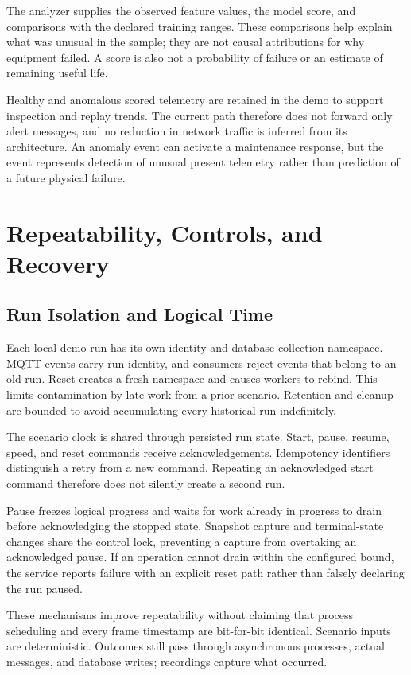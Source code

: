 \documentclass[journal]{IEEEtran}
\begin{document}
The analyzer supplies the observed feature values, the model score, and comparisons with the declared training ranges. These comparisons help explain what was unusual in the sample; they are not causal attributions for why equipment failed. A score is also not a probability of failure or an estimate of remaining useful life.

Healthy and anomalous scored telemetry are retained in the demo to support inspection and replay trends. The current path therefore does not forward only alert messages, and no reduction in network traffic is inferred from its architecture. An anomaly event can activate a maintenance response, but the event represents detection of unusual present telemetry rather than prediction of a future physical failure.

\section{Repeatability, Controls, and Recovery}
\subsection{Run Isolation and Logical Time}
Each local demo run has its own identity and database collection namespace. MQTT events carry run identity, and consumers reject events that belong to an old run. Reset creates a fresh namespace and causes workers to rebind. This limits contamination by late work from a prior scenario. Retention and cleanup are bounded to avoid accumulating every historical run indefinitely.

The scenario clock is shared through persisted run state. Start, pause, resume, speed, and reset commands receive acknowledgements. Idempotency identifiers distinguish a retry from a new command. Repeating an acknowledged start command therefore does not silently create a second run.

Pause freezes logical progress and waits for work already in progress to drain before acknowledging the stopped state. Snapshot capture and terminal-state changes share the control lock, preventing a capture from overtaking an acknowledged pause. If an operation cannot drain within the configured bound, the service reports failure with an explicit reset path rather than falsely declaring the run paused.

These mechanisms improve repeatability without claiming that process scheduling and every frame timestamp are bit-for-bit identical. Scenario inputs are deterministic. Outcomes still pass through asynchronous processes, actual messages, and database writes; recordings capture what occurred.
\end{document}
